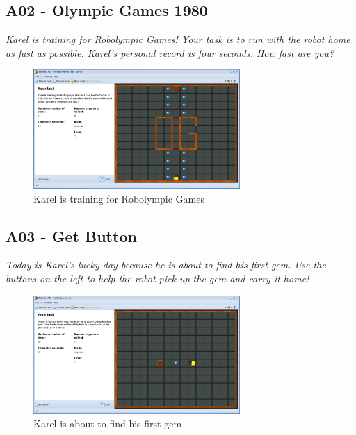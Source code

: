 \documentclass[article,A4,12pt]{llncs}
\begin{document}
\newpage

\subsection{A02 - Olympic Games 1980}

{\em Karel is training for Robolympic Games! Your task is to run with 
the robot home as fast as possible. Karel's personal record is four seconds. How fast are you?}

\begin{figure}[!ht]
\begin{center}
\includegraphics[width=0.7\textwidth]{img/a02.png}
\end{center}
\vspace{-4mm}
\caption{Karel is training for Robolympic Games}
\label{fig:a02}
\vspace{-4mm}
\end{figure}
\noindent

\subsection{A03 - Get Button}

{\em Today is Karel's lucky day because he is about to find his first gem. 
Use the buttons on the left to help the robot pick up the gem and carry it 
home!}

\begin{figure}[!ht]
\begin{center}
\includegraphics[width=0.7\textwidth]{img/a03.png}
\end{center}
\vspace{-4mm}
\caption{Karel is about to find his first gem}
\label{fig:a03}
\vspace{-1cm}
\end{figure}
\noindent
\newpage
\end{document}
